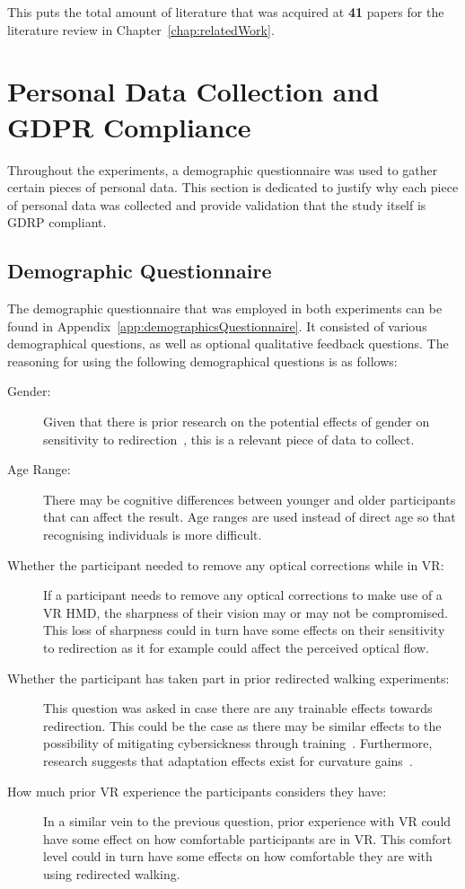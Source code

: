 This puts the total amount of literature that was acquired at \textbf{41} papers for the literature review in Chapter~\ref{chap:relatedWork}.

\section{Personal Data Collection and GDPR Compliance}
Throughout the experiments, a demographic questionnaire was used to gather certain pieces of personal data. This section is dedicated to justify why each piece of personal data was collected and provide validation that the study itself is GDRP compliant. 

\subsection{Demographic Questionnaire}
The demographic questionnaire that was employed in both experiments can be found in Appendix~\ref{app:demographicsQuestionnaire}. It consisted of various demographical questions, as well as optional qualitative feedback questions. The reasoning for using the following demographical questions is as follows:

\begin{description}
   \item[Gender:] Given that there is prior research on the potential effects of gender on sensitivity to redirection~\cite{nguyen2018individual}, this is a relevant piece of data to collect. 
   \item[Age Range:] There may be cognitive differences between younger and older participants that can affect the result. Age ranges are used instead of direct age so that recognising individuals is more difficult. 
   \item[Whether the participant needed to remove any optical corrections while in VR:] If a participant needs to remove any optical corrections to make use of a VR HMD, the sharpness of their vision may or may not be compromised. This loss of sharpness could in turn have some effects on their sensitivity to redirection as it for example could affect the perceived optical flow. 
   \item[Whether the participant has taken part in prior redirected walking experiments:] This question was asked in case there are any trainable effects towards redirection. This could be the case as there may be similar effects to the possibility of mitigating cybersickness through training~\cite{hildebrandt2018get}. Furthermore, research suggests that adaptation effects exist for curvature gains~\cite{nguyen2018individual}.
   \item[How much prior VR experience the participants considers they have:] In a similar vein to the previous question, prior experience with VR could have some effect on how comfortable participants are in VR. This comfort level could in turn have some effects on how comfortable they are with using redirected walking.
\end{description}

